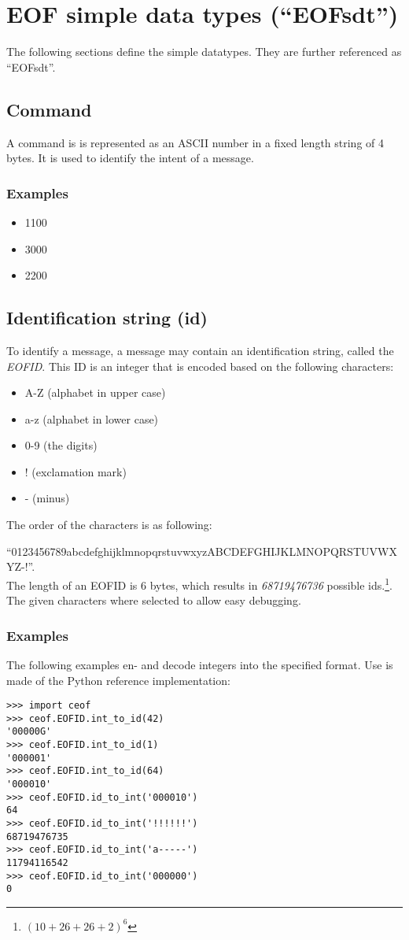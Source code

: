 \section{EOF simple data types ("`EOFsdt"')}
The following sections define the simple datatypes.
They are further referenced as "`EOFsdt"'.
\subsection{Command}
A command is is represented as an ASCII number in a fixed length string of
4 bytes. It is used to identify the intent of a message.
\subsubsection{Examples}
\begin{itemize}
\item 1100
\item 3000
\item 2200
\end{itemize}
\subsection{Identification string (id)}
\label{eofid}
To identify a message, a message may contain an identification string,
called the \textit{EOFID}.
This ID is an integer that is encoded based on the following characters:
\begin{itemize}
\item A-Z (alphabet in upper case)
\item a-z (alphabet in lower case)
\item 0-9 (the digits)
\item ! (exclamation mark)
\item - (minus)
\end{itemize}
The order of the characters is as following:

"`\small{0123456789abcdefghijklmnopqrstuvwxyzABCDEFGHIJKLMNOPQRSTUVWXYZ-!}"'.\\
The length of an EOFID is 6 bytes, which results in
\emph{68719476736} possible ids.\footnote{$(10+26+26+2)^6$}.
The given characters where selected to allow easy debugging.
\subsubsection{Examples}
The following examples en- and decode integers into the specified format.
Use is made of the Python reference implementation:
\begin{verbatim}
>>> import ceof
>>> ceof.EOFID.int_to_id(42)
'00000G'
>>> ceof.EOFID.int_to_id(1)
'000001'
>>> ceof.EOFID.int_to_id(64)
'000010'
>>> ceof.EOFID.id_to_int('000010')
64
>>> ceof.EOFID.id_to_int('!!!!!!')
68719476735
>>> ceof.EOFID.id_to_int('a-----')
11794116542
>>> ceof.EOFID.id_to_int('000000')
0
\end{verbatim}
